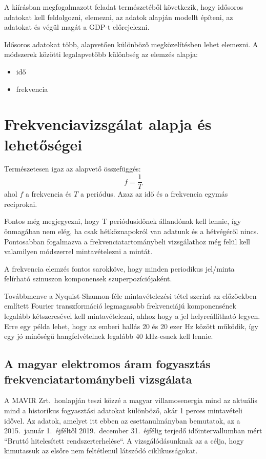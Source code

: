 A kiírásban megfogalmazott feladat természetéből következik, hogy idősoros adatokat kell
feldolgozni, elemezni, az adatok alapján modellt építeni, az adatokat és végül magát a GDP-t
előrejelezni.

Idősoros adatokat több, alapvetően különböző megközelítésben lehet elemezni. A módszerek közötti
legalapvetőbb különbség az elemzés alapja:
\begin{itemize}
    \item idő
    \item frekvencia
\end{itemize}

\section{Frekvenciavizsgálat alapja és lehetőségei}

Természetesen igaz az alapvető összefüggés:
\begin{equation}
    f = \frac{1}{T}
\end{equation}
ahol $f$ a frekvencia és $T$ a periódus. Azaz az idő és a frekvencia egymás reciprokai.

Fontos még megjegyezni, hogy T periódusidőnek állandónak kell lennie, így önmagában nem elég, ha
csak hétköznapokról van adatunk és a hétvégéről nincs. Pontosabban fogalmazva a
frekvenciatartománybeli vizsgálathoz még felül kell valamilyen módszerrel mintavételezni a mintát.

A frekvencia elemzés fontos sarokköve, hogy minden periodikus jel/minta felírható szinuszon
komponensek szuperpozíciójaként.

Továbbmenve a Nyquist-Shannon-féle mintavételezési tétel szerint az előzőekben említett Fourier
transzformáció legmagasabb frekvenciájú komponensének legalább kétszeresével kell mintavételezni,
ahhoz hogy a jel helyreállítható legyen. Erre egy példa lehet, hogy az emberi hallás 20 és 20 ezer
Hz között működik, így egy jó minőségű hangfelvételnek legalább 40 kHz-esnek kell lennie.

\subsection{A magyar elektromos áram fogyasztás frekvenciatartománybeli vizsgálata}

A MAVIR Zrt.\ honlapján teszi közzé a magyar villamosenergia mind az aktuális mind a historikus
fogyasztási adatokat különböző, akár 1 perces mintavételi idővel. Az adatok, amelyet itt ebben az
esettanulmányban bemutatok, az a 2015.\ január 1.\ éjféltől 2019.\ december 31.\ éjfélig terjedő
időintervallumban mért ``Bruttó hitelesített rendszerterhelése``. A vizsgálódásunknak az a célja,
hogy kimutassuk az elsőre nem feltétlenül látszódó ciklikusságokat.


